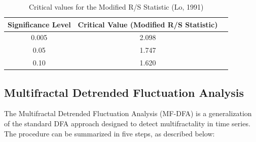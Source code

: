 \documentclass[11pt]{extarticle}
\begin{document}
\begin{table}[ht!]
\centering
\begin{tabular}{|c|c|c|}
\hline
\textbf{Significance Level} & \textbf{Critical Value (Modified R/S Statistic)} \\
\hline
0.005 & 2.098\\
0.05 & 1.747\\
0.10 & 1.620\\

\hline
\end{tabular}
\caption{Critical values for the Modified R/S Statistic (Lo, 1991)}
\end{table}


\subsection{Multifractal Detrended Fluctuation Analysis}

The Multifractal Detrended Fluctuation Analysis (MF-DFA) is a generalization of the standard DFA approach designed to detect multifractality in time series. The procedure can be summarized in five steps, as described below:
\end{document}
